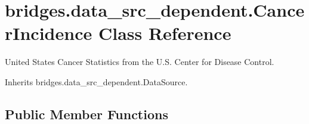 \hypertarget{classbridges_1_1data__src__dependent_1_1_cancer_incidence}{}\section{bridges.\+data\+\_\+src\+\_\+dependent.\+Cancer\+Incidence Class Reference}
\label{classbridges_1_1data__src__dependent_1_1_cancer_incidence}


United States Cancer Statistics from the U.\+S. Center for Disease Control.  




Inherits bridges.\+data\+\_\+src\+\_\+dependent.\+Data\+Source.

\subsection*{Public Member Functions}
